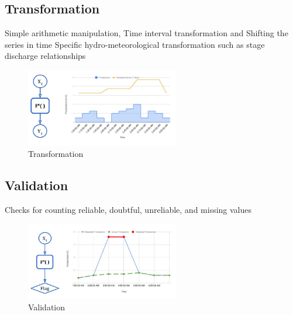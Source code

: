 \subsection{Transformation}
Simple arithmetic manipulation, Time interval transformation and Shifting the series in time
Specific hydro-meteorological transformation such as stage discharge relationships
\begin{figure}[htp]
    \centering
    \includegraphics[width=0.6\textwidth]{method/data_preprocess/transformation.jpg}
    \caption{Transformation}
    \label{fig:transformation}
\end{figure}

\subsection{Validation}
Checks for counting reliable, doubtful, unreliable, and missing values
\begin{figure}[htp]
    \centering
    \includegraphics[width=0.6\textwidth]{method/data_preprocess/validation.jpg}
    \caption{Validation}
    \label{fig:validation}
\end{figure}

